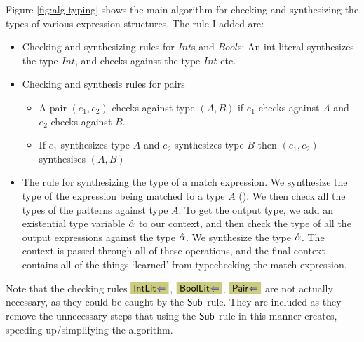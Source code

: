 Figure \ref{fig:alg-typing} shows the main algorithm for checking and synthesizing the types of various expression structures. The rule I added are: 
\begin{itemize}
    \item Checking and synthesizing rules for $Int$s and $Bool$s: An int literal synthesizes the type $Int$, and checks against the type $Int$ etc. 
    \item Checking and synthesis rules for pairs
    \begin{itemize}
        \item A pair $(e_1, e_2)$ checks against type $(A, B)$ if $e_1$ checks against $A$ and $e_2$ checks against $B$. 
        \item If $e_1$ synthesizes type $A$ and $e_2$ synthesizes type $B$ then $(e_1, e_2)$ synthesises $(A, B)$
    \end{itemize}
    \item The rule for synthesizing the type of a match expression. We synthesize the type of the expression being matched to a type $A$ (). We then check all the types of the patterns against type $A$. To get the output type, we add an existential type variable $\hat{\alpha}$ to our context, and then check the type of all the output expressions against the type $\hat{\alpha}$. We synthesize the type $\hat{\alpha}$. The context is passed through all of these operations, and the final context contains all of the things `learned' from typechecking the match expression. 
\end{itemize}

Note that the checking rules $\MyTCRule{\Intcheckrulename}$, $\MyTCRule{\Boolcheckrulename}$, $\MyTCRule{\Paircheckrulename}$ are not actually necessary, as they could be caught by the $\text{\normalfont\textsf{Sub}}$ rule. They are included as they remove the unnecessary steps that using the $\text{\normalfont\textsf{Sub}}$ rule in this manner creates, speeding up/simplifying the algorithm.

